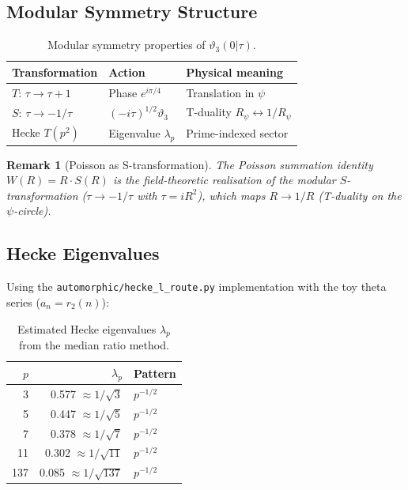 \documentclass[12pt,a4paper]{article}
\newtheorem{remark}[theorem]{Remark}
\newcommand{\Rpsi}{R_\psi}
\begin{document}
\subsection{Modular Symmetry Structure}

\begin{table}[ht]
\centering
\caption{Modular symmetry properties of $\vartheta_3(0|\tau)$.}
\begin{tabular}{lll}
\toprule
Transformation & Action & Physical meaning \\
\midrule
$T$: $\tau\to\tau+1$ & Phase $e^{i\pi/4}$ & Translation in $\psi$ \\
$S$: $\tau\to-1/\tau$ & $(-i\tau)^{1/2}\vartheta_3$ & T-duality $\Rpsi\leftrightarrow 1/\Rpsi$ \\
Hecke $T(p^2)$ & Eigenvalue $\lambda_p$ & Prime-indexed sector \\
\bottomrule
\end{tabular}
\end{table}

\begin{remark}[Poisson as S-transformation]
  The Poisson summation identity $W(R) = R\cdot S(R)$ is the
  field-theoretic realisation of the modular $S$-transformation
  ($\tau\to -1/\tau$ with $\tau = iR^2$), which maps $R\to 1/R$
  (T-duality on the $\psi$-circle).
\end{remark}

\subsection{Hecke Eigenvalues}

Using the \texttt{automorphic/hecke\_l\_route.py} implementation with
the toy theta series ($a_n = r_2(n)$):

\begin{table}[ht]
\centering
\caption{Estimated Hecke eigenvalues $\lambda_p$ from the median ratio method.}
\begin{tabular}{rrl}
\toprule
$p$ & $\lambda_p$ & Pattern \\
\midrule
3   & 0.577 $\approx 1/\sqrt{3}$   & $p^{-1/2}$ \\
5   & 0.447 $\approx 1/\sqrt{5}$   & $p^{-1/2}$ \\
7   & 0.378 $\approx 1/\sqrt{7}$   & $p^{-1/2}$ \\
11  & 0.302 $\approx 1/\sqrt{11}$  & $p^{-1/2}$ \\
137 & 0.085 $\approx 1/\sqrt{137}$ & $p^{-1/2}$ \\
\bottomrule
\end{tabular}
\end{table}
\end{document}

